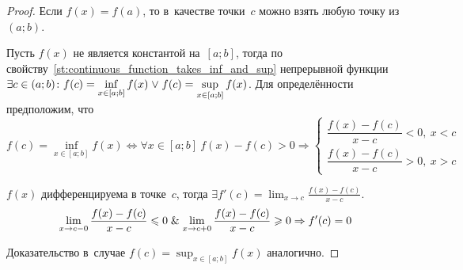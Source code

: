 \begin{wrapfigure}{r}{0pt}
\noindent
{}
\end{wrapfigure}

\begin{proof}
Если $f(x) = f(a)$, то в~качестве точки~$c$ можно взять любую точку из~$(a; b)$.

Пусть $f(x)$ не является константой на~$[a; b]$, тогда по свойству~\ref{st:continuous_function_takes_inf_and_sup} непрерывной функции $\displaystyle \exists c \in (a; b) \colon \allowbreak f(c) \opbr= \inf_{x \in [a; b]} f(x) \lOr f(c) = \sup_{x \in [a; b]} f(x)$.
Для определённости предположим, что
\begin{equation*}
f(c) = \inf_{x \in [a; b]} f(x) \Leftrightarrow
\forall x \in [a; b] \ f(x) - f(c) > 0 \Rightarrow
\begin{cases}
\dfrac{f(x) - f(c)}{x - c} < 0, \ x < c \\
\dfrac{f(x) - f(c)}{x - c} > 0, \ x > c
\end{cases}
\end{equation*}

$f(x)$ дифференцируема в точке~$c$, тогда $\displaystyle \exists f'(c) = \lim_{x \to c} \frac{f(x) - f(c)}{x - c}$.
\begin{equation*}
\lim_{x \to c-0} \frac{f(x) - f(c)}{x - c} \leqslant 0 \mathrel{\&}
\lim_{x \to c+0} \frac{f(x) - f(c)}{x - c} \geqslant 0 \Rightarrow
f'(c) = 0
\end{equation*}

Доказательство в~случае $\displaystyle f(c) = \sup_{x \in [a; b]} f(x)$ аналогично.
\end{proof}

